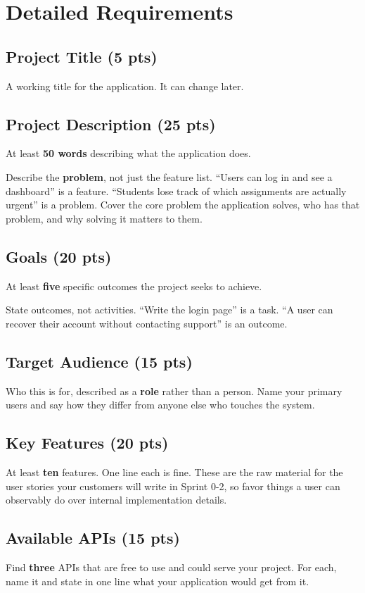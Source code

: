 \documentclass[11pt]{article}
\begin{document}
\section{Detailed Requirements}

\subsection{Project Title (5 pts)}
A working title for the application. It can change later.

\subsection{Project Description (25 pts)}
At least \textbf{50 words} describing what the application does.

Describe the \textbf{problem}, not just the feature list. ``Users can log in and see a dashboard'' is a feature. ``Students lose track of which assignments are actually urgent'' is a problem. Cover the core problem the application solves, who has that problem, and why solving it matters to them.

\subsection{Goals (20 pts)}
At least \textbf{five} specific outcomes the project seeks to achieve.

State outcomes, not activities. ``Write the login page'' is a task. ``A user can recover their account without contacting support'' is an outcome.

\subsection{Target Audience (15 pts)}
Who this is for, described as a \textbf{role} rather than a person. Name your primary users and say how they differ from anyone else who touches the system.

\subsection{Key Features (20 pts)}
At least \textbf{ten} features. One line each is fine. These are the raw material for the user stories your customers will write in Sprint 0-2, so favor things a user can observably do over internal implementation details.

\subsection{Available APIs (15 pts)}
Find \textbf{three} APIs that are free to use and could serve your project. For each, name it and state in one line what your application would get from it.
\end{document}
